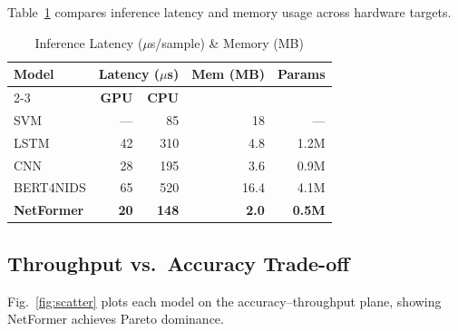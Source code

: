 \documentclass[conference]{IEEEtran}
\begin{document}
Table~\ref{tab:latency} compares inference latency and memory usage
across hardware targets.

\begin{table}[h]
	\caption{Inference Latency ($\mu$s/sample) \& Memory (MB)}
	\label{tab:latency}
	\centering
	\renewcommand{\arraystretch}{1.15}
	\begin{tabular}{@{}lrrrr@{}}
		\toprule
		\multirow{2}{*}{\textbf{Model}}
		                   & \multicolumn{2}{c}{\textbf{Latency ($\mu$s)}}
		                   & \multirow{2}{*}{\textbf{Mem (MB)}}
		                   & \multirow{2}{*}{\textbf{Params}}                                            \\
		\cmidrule(lr){2-3}
		                   & \textbf{GPU}                                  & \textbf{CPU}  &      &      \\
		\midrule
		SVM                & ---                                           & 85            & 18   & ---  \\
		LSTM               & 42                                            & 310           & 4.8  & 1.2M \\
		CNN                & 28                                            & 195           & 3.6  & 0.9M \\
		BERT4NIDS          & 65                                            & 520           & 16.4 & 4.1M \\
		\textbf{NetFormer} & \textbf{20}                                   & \textbf{148}
		                   & \textbf{2.0}                                  & \textbf{0.5M}               \\
		\bottomrule
	\end{tabular}
\end{table}

\subsection{Throughput vs.\ Accuracy Trade-off}

Fig.~\ref{fig:scatter} plots each model on the accuracy--throughput
plane, showing NetFormer achieves Pareto dominance.
\end{document}
